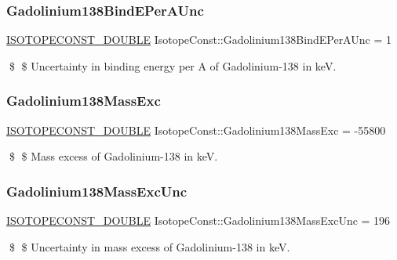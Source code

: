 \subsubsection{\texorpdfstring{Gadolinium138\+Bind\+E\+Per\+A\+Unc}{Gadolinium138BindEPerAUnc}}
{\footnotesize\ttfamily \mbox{\hyperlink{group___isotope_const-_macros_ga8f45a7272ce02c0b4c65c44636ed719a}{I\+S\+O\+T\+O\+P\+E\+C\+O\+N\+S\+T\+\_\+\+D\+O\+U\+B\+LE}} Isotope\+Const\+::\+Gadolinium138\+Bind\+E\+Per\+A\+Unc = 1}

\$ \$ Uncertainty in binding energy per A of Gadolinium-\/138 in keV. \mbox{\label{group___isotope_const-_gadolinium-_gd138_gab616fa7bd68ce3a3581e10f7e3871c68}} 
\subsubsection{\texorpdfstring{Gadolinium138\+Mass\+Exc}{Gadolinium138MassExc}}
{\footnotesize\ttfamily \mbox{\hyperlink{group___isotope_const-_macros_ga8f45a7272ce02c0b4c65c44636ed719a}{I\+S\+O\+T\+O\+P\+E\+C\+O\+N\+S\+T\+\_\+\+D\+O\+U\+B\+LE}} Isotope\+Const\+::\+Gadolinium138\+Mass\+Exc = -\/55800}

\$ \$ Mass excess of Gadolinium-\/138 in keV. \mbox{\label{group___isotope_const-_gadolinium-_gd138_gafff6fb0990b5bb8ad1efae1b92616cd0}} 
\subsubsection{\texorpdfstring{Gadolinium138\+Mass\+Exc\+Unc}{Gadolinium138MassExcUnc}}
{\footnotesize\ttfamily \mbox{\hyperlink{group___isotope_const-_macros_ga8f45a7272ce02c0b4c65c44636ed719a}{I\+S\+O\+T\+O\+P\+E\+C\+O\+N\+S\+T\+\_\+\+D\+O\+U\+B\+LE}} Isotope\+Const\+::\+Gadolinium138\+Mass\+Exc\+Unc = 196}

\$ \$ Uncertainty in mass excess of Gadolinium-\/138 in keV. \mbox{\label{group___isotope_const-_gadolinium-_gd138_ga0485cd4e30355d1d225ae5352338672b}} 
